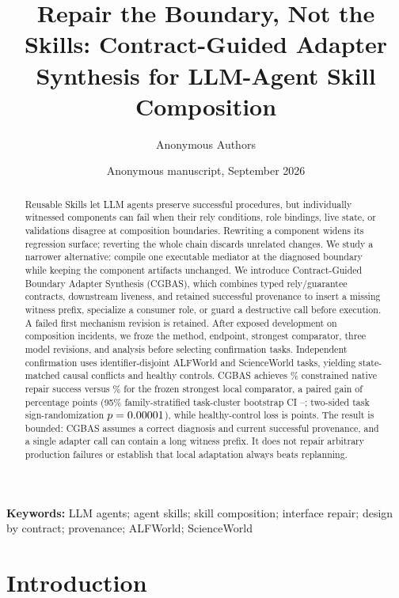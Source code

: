 \documentclass[10pt]{article}
\title{Repair the Boundary, Not the Skills: Contract-Guided Adapter Synthesis for LLM-Agent Skill Composition}
\author{Anonymous Authors}
\date{Anonymous manuscript, September 2026}
\begin{document}
\maketitle

\begin{abstract}
Reusable Skills let LLM agents preserve successful procedures, but individually
witnessed components can fail when their rely conditions, role bindings, live
state, or validations disagree at composition boundaries. Rewriting a component
widens its regression surface; reverting the whole chain discards unrelated
changes. We study a narrower alternative: compile one executable mediator at the
diagnosed boundary while keeping the component artifacts unchanged. We introduce
Contract-Guided Boundary Adapter Synthesis (CGBAS), which combines typed
rely/guarantee contracts, downstream liveness, and retained successful provenance
to insert a missing witness prefix, specialize a consumer role, or guard a
destructive call before execution. A failed first mechanism revision is retained.
After exposed development on \DevelopmentIncidentCount{} composition incidents,
we froze the method, endpoint, strongest comparator, three model revisions, and
analysis before selecting confirmation tasks. Independent confirmation uses
\ConfirmationRosterCount{} identifier-disjoint ALFWorld and ScienceWorld tasks,
yielding \ValidCausalCount{} state-matched causal conflicts and
\ValidControlCount{} healthy controls. CGBAS achieves
\PrimaryMethodRate\% constrained native repair success versus
\PrimaryComparatorRate\% for the frozen strongest local comparator, a paired
gain of \PrimaryGain{} percentage points (95\% family-stratified task-cluster
bootstrap CI \PrimaryCILow--\PrimaryCIHigh; two-sided task sign-randomization
$p=0.00001$), while healthy-control loss is \ControlLoss{} points. The result
is bounded: CGBAS assumes a correct diagnosis and current successful provenance,
and a single adapter call can contain a long witness prefix. It does not repair
arbitrary production failures or establish that local adaptation always beats
replanning.
\end{abstract}

\noindent\textbf{Keywords:} LLM agents; agent skills; skill composition;
interface repair; design by contract; provenance; ALFWorld; ScienceWorld

\section{Introduction}
\end{document}
